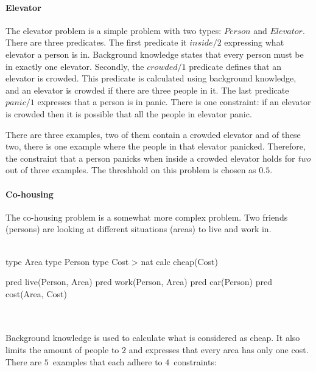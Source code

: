 \paragraph{Elevator}
The elevator problem is a simple problem with two types: $\mathit{Person}$ and $\mathit{Elevator}$.
There are three predicates.
The first predicate it $\mathit{inside}/2$ expressing what elevator a person is in.
Background knowledge states that every person must be in exactly one elevator.
Secondly, the $\mathit{crowded}/1$ predicate defines that an elevator is crowded.
This predicate is calculated using background knowledge, and an elevator is crowded if there are three people in it.
The last predicate $\mathit{panic}/1$ expresses that a person is in panic.
There is one constraint: if an elevator is crowded then it is possible that all the people in elevator panic.

There are three examples, two of them contain a crowded elevator and of these two, there is one example where the people in that elevator panicked.
Therefore, the constraint that a person panicks when inside a crowded elevator holds for \emph{two} out of three examples.
The threshhold on this problem is chosen as $0.5$.

\paragraph{Co-housing}
The co-housing problem is a somewhat more complex problem.
Two friends (persons) are looking at different situations (areas) to live and work in.
\\\\
\begin{minipage}{0.5\textwidth}
	\begin{verbatim*}
		type Area
		type Person
		type Cost > nat
		calc cheap(Cost)
	\end{verbatim*}
\end{minipage}
\begin{minipage}{0.5\textwidth}
	\begin{verbatim*}
		pred live(Person, Area)
		pred work(Person, Area)
		pred car(Person)
		pred cost(Area, Cost)
	\end{verbatim*}
\end{minipage}
\\\\

Background knowledge is used to calculate what is considered as cheap.
It also limits the amount of people to $2$ and expresses that every area has only one cost.
There are $5$~examples that each adhere to $4$~constraints:

